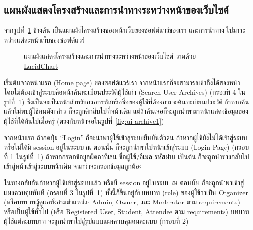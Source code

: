 \documentclass[12pt,one side,openright,a4paper]{cpe-thesis-th}
\newcommand{\thaijustify}[1]{%
  \par\hspace{30pt}\justifying
  #1
}
\begin{document}
\subsection{แผนผังแสดงโครงสร้างและการนำทางระหว่างหน้าของเว็บไซต์}
\thaijustify{
  จากรูปที่~\ref{fig:nav-map} ข้างต้น เป็นแผนผังโครงสร้างของหน้าเว็บของซอฟต์แวร์ของเรา และการนำทาง ไปมาระหว่างแต่ละหน้าเว็บของซอฟต์แวร์
}
\begin{figure}[H]
  \centering
  \caption[ภาพแผนผังการสัญจรและนำทางระหว่างหน้าของเว็บไซต์]{แผนผังแสดงโครงสร้างและการนำทางระหว่างหน้าของเว็บไซต์ วาดด้วย \href{https://lucid.app/}{LucidChart}}
  \label{fig:nav-map}
\end{figure}
\thaijustify{
  เริ่มต้นจากหน้าแรก (Home page) ของซอฟต์แวร์เรา จากหน้าแรกก็จะสามารถเข้าถึงได้สองหน้า โดยไม่ต้องเข้าสู่ระบบคือหน้าค้นทะเบียนประวัติผู้ใช้เก่า (Search User Archives) (กรอบที่ 4 ในรูปที่~\ref{fig:nav-map}) ซึ่งเป็นจะเป็นหน้าสำหรับกรอกรหัสหรือชื่อของผู้ใช้ที่ต้องการจะค้นทะเบียนประวัติ ถ้าหากค้นแล้วไม่พบผู้ใช้คนดังกล่าว ก็จะถูกตีกลีบไปที่หน้าเดิม แต่ถ้าค้นเจอก็จะถูกนำพามาหน้าแสดงข้อมูลของผู้ใช้ที่ได้ค้นไปเมื่อครู่ (ตรงกับหน้าจอในรูปที่~\ref{fig:ui-archive1})
}
\thaijustify{
  จากหน้าแรก ถ้ากดปุ่ม “Login” ก็จะนำพาผู้ใช้เข้าสู่ระบบยืนยันตัวตน ถ้าหากผู้ใช้ยังไม่ได้เข้าสู่ระบบหรือไม่ได้มี session อยู่ในระบบ ณ ตอนนั้น ก็จะถูกนำพาไปหน้าเข้าสู่ระบบ (Login Page) (กรอบที่ 1 ในรูปที่~\ref{fig:nav-map}) ถ้าหากกรอกข้อมูลผิดอาทิเช่น ชื่อผู้ใช้/อีเมล รหัสผ่าน เป็นต้น ก็จะถูกนำทางกลับไปเข้าสู่หน้าเข้าสู่ระบบหน้าเดิม จนกว่าจะกรอกข้อมูลถูกต้อง
}
\thaijustify{
  ในทางกลับกันถ้าหากผู้ใช้เข้าสู่ระบบแล้ว หรือมี session อยู่ในระบบ ณ ตอนนั้น ก็จะถูกนำพาเข้าสู่แผงควบคุมทันที (กรอบที่ 3 ในรูปที่~\ref{fig:nav-map}) ทั้งนี้ก็ขึ้นอยู่กับบทบาท (role) ของผู้ใช้ว่าเป็น Organizer (หรือบทบาทผู้ดูแลทั้งสามตำแหน่ง: Admin, Owner, และ Moderator ตาม requirements) หรือเป็นผู้ใช้ทั่วไป (หรือ Registered User, Student, Attendee ตาม requirements) บทบาทผู้ใช้แต่ละบทบาท จะถูกนำพาไปสู่รูปแบบแผงควบคุมคนละแบบ (กรอบที่ 2)
}
\end{document}
